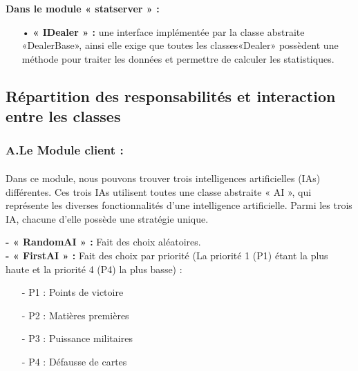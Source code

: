 \documentclass[13pt ,a4paper ]{report}
\begin{document}
\begin{multicols}{2}
\textbf{Dans le module « statserver » :}
 	\begin{itemize}
 	\item[•]\textbf{« IDealer » :} une interface implémentée par la classe abstraite «DealerBase», ainsi elle exige que toutes les classes«Dealer» possèdent une méthode pour traiter les données et permettre de calculer les statistiques.
 	
 	\end{itemize}

	\subsection{Répartition des responsabilités et interaction entre les classes }
  		\subsubsection{A.\hspace*{0.5cm}Le Module client :}
 		\paragraph{}
 
Dans ce module, nous pouvons trouver trois intelligences artificielles (IAs) différentes.
Ces trois IAs utilisent toutes une classe abstraite « AI », qui représente les diverses fonctionnalités d’une intelligence artificielle.
Parmi les trois IA, chacune d’elle possède une stratégie unique.

\begin{flushleft}
 \textbf{- « RandomAI » : }Fait des choix aléatoires.\\
\textbf{- « FirstAI » :} Fait des choix par priorité (La priorité 1 (P1) étant la plus haute et la priorité 4 (P4) la plus basse) :
\begin{itemize}
\item[-]P1 : Points de victoire
\item[-]P2 : Matières premières
\item[-]P3 : Puissance militaires
\item[-]P4 : Défausse de cartes
\end{itemize}


\end{flushleft}
\end{multicols}
\end{document}
